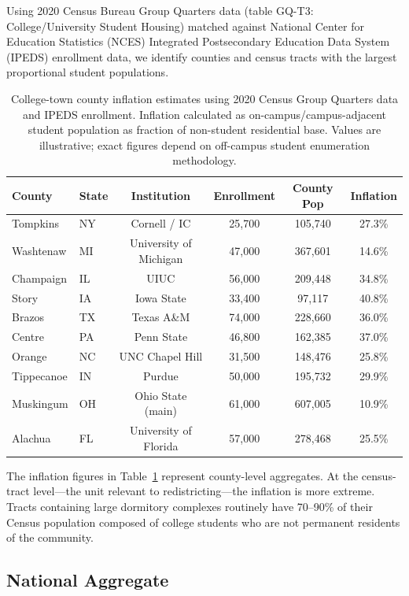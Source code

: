 Using 2020 Census Bureau Group Quarters data (table GQ-T3: College/University Student Housing) matched against National Center for Education Statistics (NCES) Integrated Postsecondary Education Data System (IPEDS) enrollment data, we identify counties and census tracts with the largest proportional student populations.

\begin{table}[htbp]
\centering
\small
\begin{tabular}{llcccc}
\toprule
\textbf{County} & \textbf{State} & \textbf{Institution} & \textbf{Enrollment} & \textbf{County Pop} & \textbf{Inflation} \\
\midrule
Tompkins & NY & Cornell / IC & 25,700 & 105,740 & 27.3\% \\
Washtenaw & MI & University of Michigan & 47,000 & 367,601 & 14.6\% \\
Champaign & IL & UIUC & 56,000 & 209,448 & 34.8\% \\
Story & IA & Iowa State & 33,400 & 97,117 & 40.8\% \\
Brazos & TX & Texas A\&M & 74,000 & 228,660 & 36.0\% \\
Centre & PA & Penn State & 46,800 & 162,385 & 37.0\% \\
Orange & NC & UNC Chapel Hill & 31,500 & 148,476 & 25.8\% \\
Tippecanoe & IN & Purdue & 50,000 & 195,732 & 29.9\% \\
Muskingum & OH & Ohio State (main) & 61,000 & 607,005 & 10.9\% \\
Alachua & FL & University of Florida & 57,000 & 278,468 & 25.5\% \\
\bottomrule
\end{tabular}
\caption{College-town county inflation estimates using 2020 Census Group Quarters data and IPEDS enrollment. Inflation calculated as on-campus/campus-adjacent student population as fraction of non-student residential base. Values are illustrative; exact figures depend on off-campus student enumeration methodology.}
\label{tab:inflation}
\end{table}

The inflation figures in Table~\ref{tab:inflation} represent county-level aggregates. At the census-tract level---the unit relevant to redistricting---the inflation is more extreme. Tracts containing large dormitory complexes routinely have 70--90\% of their Census population composed of college students who are not permanent residents of the community.

\subsection{National Aggregate}

